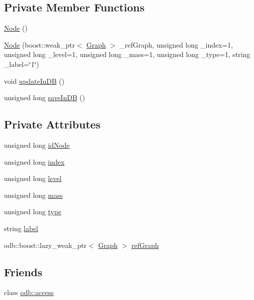 \subsection*{Private Member Functions}
\begin{DoxyCompactItemize}
\item 
\hyperlink{class_node_ad7a34779cad45d997bfd6d3d8043c75f}{Node} ()
\item 
\hyperlink{class_node_a627ac5e5a47839cf0c02d9f83b69f8bb}{Node} (boost\+::weak\+\_\+ptr$<$ \hyperlink{class_graph}{Graph} $>$ \+\_\+ref\+Graph, unsigned long \+\_\+index=1, unsigned long \+\_\+level=1, unsigned long \+\_\+mass=1, unsigned long \+\_\+type=1, string \+\_\+label=\char`\"{}1\char`\"{})
\item 
void \hyperlink{class_node_a0ef049284a76ea7cbe887ba47c780ccb}{update\+In\+D\+B} ()
\item 
unsigned long \hyperlink{class_node_a927cce8685d2e64fbbf140bac543e349}{save\+In\+D\+B} ()
\end{DoxyCompactItemize}
\subsection*{Private Attributes}
\begin{DoxyCompactItemize}
\item 
unsigned long \hyperlink{class_node_a667a28954db4a733c604f01b654c8dcb}{id\+Node}
\item 
unsigned long \hyperlink{class_node_a0f2938cdfe2a71ed6e4c14e82e7e91c9}{index}
\item 
unsigned long \hyperlink{class_node_aec749ad67497b24bd5e92f27ce3a6005}{level}
\item 
unsigned long \hyperlink{class_node_a90d7ce5aade21123ad023a1918494b08}{mass}
\item 
unsigned long \hyperlink{class_node_a4616fefc7aae8c804e930b2b6018d182}{type}
\item 
string \hyperlink{class_node_a303618c90c74231cce2c097e3fdb7f02}{label}
\item 
odb\+::boost\+::lazy\+\_\+weak\+\_\+ptr$<$ \hyperlink{class_graph}{Graph} $>$ \hyperlink{class_node_a6494e887df5047761edf460fabe15383}{ref\+Graph}
\end{DoxyCompactItemize}
\subsection*{Friends}
\begin{DoxyCompactItemize}
\item 
class \hyperlink{class_node_acb4d953abf85ae525f1d06a0c3a86a55}{odb\+::access}
\end{DoxyCompactItemize}


